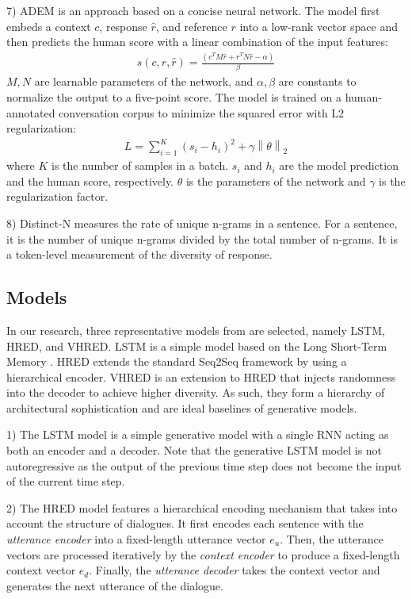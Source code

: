 \documentclass[runningheads]{llncs}
\begin{document}
    7) ADEM \cite{ADEM} is an approach based on a concise neural network. The model first embeds a context $c$, response $\hat{r}$, and reference $r$ into a low-rank vector space and then predicts the human score with a linear combination of the input features:
    \begin{align}
        s(c, r, \hat{r}) = \frac{(c^T M \hat{r} + r^T N \hat{r} - \alpha)}{\beta}
    \end{align}
    $M, N$ are learnable parameters of the network, and $\alpha, \beta$ are constants to normalize the output to a five-point score. The model is trained on a human-annotated conversation corpus to minimize the squared error with L2 regularization:
    \begin{align}
        L = \sum_{i=1}^{K} (s_i - h_i)^2 + \gamma \left\| \theta \right\| _2
    \end{align}
    where $K$ is the number of samples in a batch. $s_i$ and $h_i$ are the model prediction and the human score, respectively. $\theta$ is the parameters of the network and $\gamma$ is the regularization factor.

    8) Distinct-N \cite{MMI} measures the rate of unique n-grams in a sentence. For a sentence, it is the number of unique n-grams divided by the total number of n-grams. It is a token-level measurement of the diversity of response.

    \subsection{Models}
    In our research, three representative models from \cite{VHRED} are selected, namely LSTM, HRED, and VHRED. LSTM is a simple model based on the Long Short-Term Memory \cite{LSTM}. HRED extends the standard Seq2Seq framework by using a hierarchical encoder. VHRED is an extension to HRED that injects randomness into the decoder to achieve higher diversity. As such, they form a hierarchy of architectural sophistication and are ideal baselines of generative models.

    1) The LSTM model is a simple generative model with a single RNN acting as both an encoder and a decoder. Note that the generative LSTM model is not autoregressive as the output of the previous time step does not become the input of the current time step.

    2) The HRED model \cite{hred-qs,HRED} features a hierarchical encoding mechanism that takes into account the structure of dialogues. It first encodes each sentence with the \emph{utterance encoder} into a fixed-length utterance vector $e_u$. Then, the utterance vectors are processed iteratively by the \emph{context encoder} to produce a fixed-length context vector $e_d$. Finally, the \emph{utterance decoder} takes the context vector and generates the next utterance of the dialogue.
\end{document}
